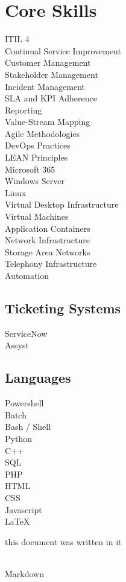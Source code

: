 \documentclass{report}
\begin{document}
	\section*{Core Skills}
		\begin{multicols}{3}
			ITIL 4\\
			Continual Service Improvement\\
			Customer Management\\
			Stakeholder Management\\
			Incident Management\\
			SLA and KPI Adherence\\
			Reporting\\
			Value-Stream Mapping\\
			Agile Methodologies\\
			DevOps Practices\\
			LEAN Principles\\
			Microsoft 365\\
			Windows Server\\
			Linux\\
			Virtual Desktop Infrastructure\\
			Virtual Machines\\
			Application Containers\\
			Network Infrastructure\\
			Storage Area Networks\\
			Telephony Infrastructure\\
			Automation
		\end{multicols}
		
		\subsection*{Ticketing Systems}
			\begin{multicols}{3}
				ServiceNow\\
				Assyst
			\end{multicols}
		
		\subsection*{Languages}
			\begin{multicols}{3}
				Powershell\\
				Batch\\
				Bash / Shell\\
				Python\\
				C++\\
				SQL\\
				PHP\\
				HTML\\
				CSS\\
				Javascript\\
				LaTeX \begin{tiny}this document was written in it\end{tiny}\\
				Markdown
			\end{multicols}
	
\end{document}

